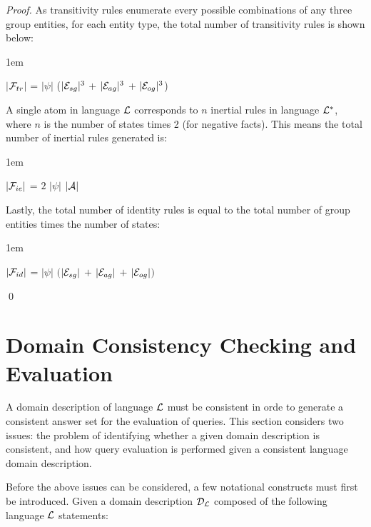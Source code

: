 \documentclass[global,twocolumn,final]{svjour}
\newenvironment{vproof}
  {\begin{proof}\hspace{0.25em}}
  {\qed\end{proof}}
\newenvironment{vquote}
  {\begin{list}{}{\leftmargin 1em}\item[]}
  {\end{list}}
\begin{document}
\begin{vproof}
          As transitivity rules enumerate every possible combinations of any
          three group entities, for each entity type, the total number of
          transitivity rules is shown below:

          \begin{vquote}
            $|$${\cal F}_{tr}$$|$ =
            $|\psi|$
            ($|{\cal E}_{sg}|^{3}$ $+$
            $|{\cal E}_{ag}|^{3}$ $+$
            $|{\cal E}_{og}|^{3}$)
          \end{vquote}

          A single atom in language ${\cal L}$ corresponds to $n$ inertial
          rules in language ${\cal L}^{*}$, where $n$ is the number of states
          times 2 (for negative facts). This means the total number of
          inertial rules generated is:

          \begin{vquote}
            $|{\cal F}_{ie}|$ = $2$ $|\psi|$ $|{\cal A}|$
          \end{vquote}

          Lastly, the total number of identity rules is equal to the total
          number of group entities times the number of states:

          \begin{vquote}
            $|{\cal F}_{id}|$ =
            $|\psi|$
            $($$|{\cal E}_{sg}|$ $+$ $|{\cal E}_{ag}|$ $+$ $|{\cal E}_{og}|$$)$
          \end{vquote}
        \end{vproof}

  \section{Domain Consistency Checking and Evaluation}
    \label{sec-cons}

    A domain description of language ${\cal L}$ must be consistent in orde to
    generate a consistent answer set for the evaluation of queries. This
    section considers two issues: the problem of identifying whether a given
    domain description is consistent, and how query evaluation is performed
    given a consistent language domain description.

    Before the above issues can be considered, a few notational constructs
    must first be introduced. Given a domain description ${\cal D_{L}}$
    composed of the following language ${\cal L}$ statements:
\end{document}
